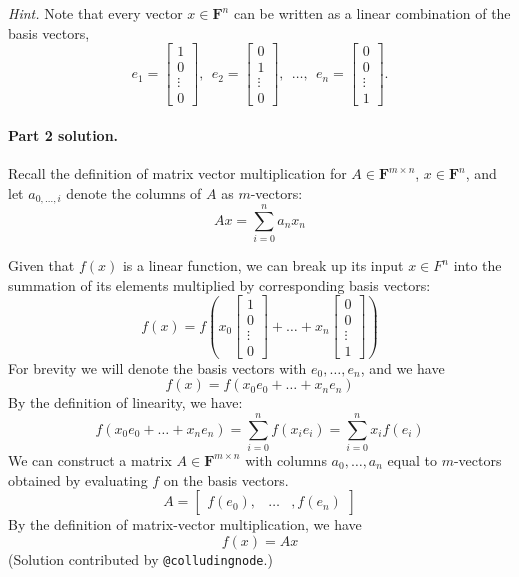 \documentclass[12pt,hidelinks]{article}
\newcommand{\field}{\mathbf{F}}
\begin{document}
\emph{Hint.} Note that every vector $x \in \field^n$ can be written
as a linear combination of the basis vectors,
\[
    e_1 = \begin{bmatrix}
        1\\0\\\vdots\\0
    \end{bmatrix},
    ~~
    e_2 = 
    \begin{bmatrix}
        0\\1\\\vdots\\0
    \end{bmatrix},
    ~~
    \dots,
    ~~
    e_n = 
    \begin{bmatrix}
        0\\0\\\vdots\\1
    \end{bmatrix}.
\]

\begin{solution}
\paragraph{Part 2 solution.} 
Recall the definition of matrix vector multiplication for $A \in \field^{m \times n }$, $x \in \field^n$, and let $a_{0, \dots , i}$ denote the columns of $A$ as $m$-vectors:
\[
Ax = \sum_{i=0}^{n} a_{n}x_{n}
\]

Given that $f(x)$ is a linear function, we can break up its input $x \in F^n$ into the summation of its elements multiplied by corresponding basis vectors:
\[
f(x) = f(x_{0}\begin{bmatrix}
        1\\0\\\vdots\\0
    \end{bmatrix} + \dots + x_{n}\begin{bmatrix}
        0\\0\\\vdots\\1
    \end{bmatrix})
\]
For brevity we will denote the basis vectors with $e_{0}, \dots , e_{n}$, and we have
\[
f(x) = f(x_{0}e_{0} + \dots + x_{n}e_{n})
\]
By the definition of linearity, we have:
\[
f(x_{0}e_{0} + \dots + x_{n}e_{n}) = \sum_{i=0}^{n}f(x_{i}e_{i}) = \sum_{i=0}^{n}x_{i}f(e_{i})
\]
We can construct a matrix $A \in \field^{m \times n}$ with columns $a_{0}, \dots , a_{n}$ equal to $m$-vectors obtained by evaluating $f$ on the basis vectors.
\[
A = \begin{bmatrix} f(e_{0}) , & \dots &, f(e_{n}) \end{bmatrix}
\]
By the definition of matrix-vector multiplication, we have
\[
f(x) = Ax
\]
(Solution
contributed by \verb|@colludingnode|.)
\end{solution}
\end{document}
